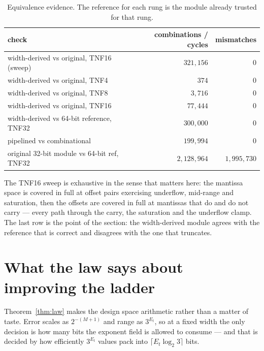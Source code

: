 \begin{table}[t]\centering
\caption{Equivalence evidence. The reference for each rung is the module already
trusted for that rung.}
\label{tab:equiv}
\begin{tabular}{lrr}
\toprule
check & combinations / cycles & mismatches \\
\midrule
width-derived vs original, TNF16 (sweep)      & $321{,}156$   & $0$ \\
width-derived vs original, TNF4               & $374$         & $0$ \\
width-derived vs original, TNF8               & $3{,}716$     & $0$ \\
width-derived vs original, TNF16              & $77{,}444$    & $0$ \\
width-derived vs 64-bit reference, TNF32      & $300{,}000$   & $0$ \\
pipelined vs combinational                     & $199{,}994$   & $0$ \\
\midrule
original 32-bit module vs 64-bit ref, TNF32   & $2{,}128{,}964$ & $1{,}995{,}730$ \\
\bottomrule
\end{tabular}
\end{table}

The TNF16 sweep is exhaustive in the sense that matters here: the mantissa space
is covered in full at offset pairs exercising underflow, mid-range and
saturation, then the offsets are covered in full at mantissas that do and do not
carry --- every path through the carry, the saturation and the underflow clamp.
The last row is the point of the section: the width-derived module agrees with
the reference that is correct and disagrees with the one that truncates.


\section{What the law says about improving the ladder}\label{sec:design}



Theorem~\ref{thm:law} makes the design space arithmetic rather than a matter of
taste. Error scales as $2^{-(M+1)}$ and range as $3^{E_t}$, so at a fixed width
the only decision is how many bits the exponent field is allowed to consume ---
and that is decided by how efficiently $3^{E_t}$ values pack into
$\lceil E_t \log_2 3\rceil$ bits.

